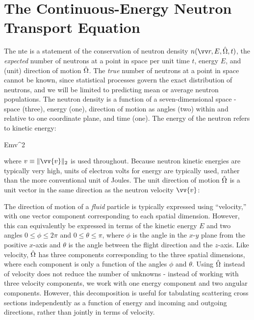 \section{The Continuous-Energy Neutron Transport Equation}
\label{sec:CE_NTE}

The \gls{nte} is a statement of the conservation of neutron density \(n\seat\), the {\it expected} number of neutrons at a point in space per unit time \(t\), energy \(E\), and (unit) direction of motion \(\hat{\Omega}\). The {\it true} number of neutrons at a point in space cannot be known, since statistical processes govern the exact distribution of neutrons, and we will be limited to predicting mean or average neutron populations. The neutron density is a function of a seven-dimensional space - space (three), energy (one), direction of motion as angles (two) within and relative to one coordinate plane, and time (one). The energy of the neutron refers to kinetic energy:

\beq
\label{eq:KineticEnergyDef}
E\equiv{}mv^2
\eeq

where \(v\equiv\|\vv{v}\|_2\) is used throughout. Because neutron kinetic energies are typically very high, units of electron volts for energy are typically used, rather than the more conventional unit of Joules. The unit direction of motion \(\hat{\Omega}\) is a unit vector in the same direction as the neutron velocity \(\vv{v}\):

\beq
\label{eq:OmegaDef}
\hO\equiv {}
\eeq

The direction of motion of a {\it fluid} particle is typically expressed using ``velocity,'' with one vector component corresponding to each spatial dimension. However, this can equivalently be expressed in terms of the kinetic energy \(E\) and two angles \(0\leq\phi\leq2\pi\) and \(0\leq\theta\leq\pi\), where \(\phi\) is the angle in the \(x\)-\(y\) plane from the positive \(x\)-axis and \(\theta\) is the angle between the flight direction and the \(z\)-axis. Like velocity, \(\hat{\Omega}\) has three components corresponding to the three spatial dimensions, where each component is only a function of the angles \(\phi\) and \(\theta\). Using \(\hat{\Omega}\) instead of velocity does not reduce the number of unknowns - instead of working with three velocity components, we work with one energy component and two angular components. However, this decomposition is useful for tabulating scattering cross sections independently as a function of energy and incoming and outgoing directions, rather than jointly in terms of velocity.

